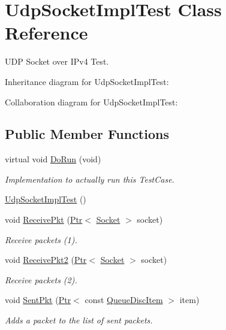 \hypertarget{classUdpSocketImplTest}{}\section{Udp\+Socket\+Impl\+Test Class Reference}
\label{classUdpSocketImplTest}


U\+DP Socket over I\+Pv4 Test.  




Inheritance diagram for Udp\+Socket\+Impl\+Test\+:


Collaboration diagram for Udp\+Socket\+Impl\+Test\+:
\subsection*{Public Member Functions}
\begin{DoxyCompactItemize}
\item 
virtual void \hyperlink{classUdpSocketImplTest_a186599e6487c7c550383f236042f3cd4}{Do\+Run} (void)
\begin{DoxyCompactList}\small\item\em Implementation to actually run this Test\+Case. \end{DoxyCompactList}\item 
\hyperlink{classUdpSocketImplTest_a108f556465911648e4320edf060e8d93}{Udp\+Socket\+Impl\+Test} ()
\item 
void \hyperlink{classUdpSocketImplTest_ac01935324b65cb16be8f50eadcfaa8b9}{Receive\+Pkt} (\hyperlink{classns3_1_1Ptr}{Ptr}$<$ \hyperlink{classns3_1_1Socket}{Socket} $>$ socket)
\begin{DoxyCompactList}\small\item\em Receive packets (1). \end{DoxyCompactList}\item 
void \hyperlink{classUdpSocketImplTest_a6b44ac203ae4bf29c962a7d552b2c4aa}{Receive\+Pkt2} (\hyperlink{classns3_1_1Ptr}{Ptr}$<$ \hyperlink{classns3_1_1Socket}{Socket} $>$ socket)
\begin{DoxyCompactList}\small\item\em Receive packets (2). \end{DoxyCompactList}\item 
void \hyperlink{classUdpSocketImplTest_ad2c66c7cb086bbb4b6932becce0a01f7}{Sent\+Pkt} (\hyperlink{classns3_1_1Ptr}{Ptr}$<$ const \hyperlink{classns3_1_1QueueDiscItem}{Queue\+Disc\+Item} $>$ item)
\begin{DoxyCompactList}\small\item\em Adds a packet to the list of sent packets. \end{DoxyCompactList}\end{DoxyCompactItemize}
